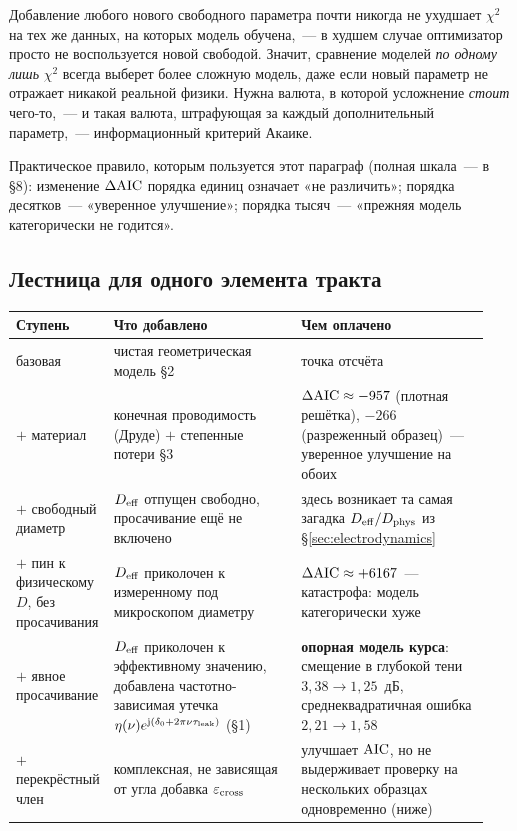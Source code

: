 \begin{intuition}
Добавление любого нового свободного параметра почти никогда не ухудшает $\chi^2$ на тех же
данных, на которых модель обучена,~--- в худшем случае оптимизатор просто не воспользуется новой
свободой. Значит, сравнение моделей \emph{по одному лишь} $\chi^2$ всегда выберет более сложную
модель, даже если новый параметр не отражает никакой реальной физики. Нужна валюта, в которой
усложнение \emph{стоит} чего-то,~--- и такая валюта, штрафующая за каждый дополнительный
параметр,~--- информационный критерий Акаике.
\end{intuition}

\noindent
Практическое правило, которым пользуется этот параграф (полная шкала~--- в §8): изменение
$\Delta\mathrm{AIC}$ порядка единиц означает «не различить»; порядка десятков~--- «уверенное улучшение»;
порядка тысяч~--- «прежняя модель категорически не годится».

\subsection{Лестница для одного элемента тракта}
\label{subsec:ladder-single}

\begin{center}
\footnotesize
\setlength{\tabcolsep}{6pt}
\begin{tabular}{@{}p{0.14\linewidth}p{0.40\linewidth}p{0.40\linewidth}@{}}
\toprule
\textbf{Ступень} & \textbf{Что добавлено} & \textbf{Чем оплачено} \\
\midrule
базовая & чистая геометрическая модель §2 & точка отсчёта \\
$+$ материал & конечная проводимость (Друде) $+$ степенные потери §3 &
$\Delta\mathrm{AIC}\approx-957$ (плотная решётка), $-266$ (разреженный образец)~--- уверенное улучшение на
обоих \\
$+$ свободный диаметр & $D_{\mathrm{eff}}$ отпущен свободно, просачивание ещё не включено & здесь
возникает та самая загадка $D_{\mathrm{eff}}/D_{\mathrm{phys}}$ из §\ref{sec:electrodynamics} \\
$+$ пин к физическому $D$, без просачивания & $D_{\mathrm{eff}}$ приколочен к измеренному под микроскопом
диаметру & $\Delta\mathrm{AIC}\approx+6167$~--- катастрофа: модель категорически хуже \\
$+$ явное просачивание & $D_{\mathrm{eff}}$ приколочен к эффективному значению, добавлена
частотно-зависимая утечка $\eta(\nu)e^{\mathrm{j}(\delta_0+2\pi\nu\tau_{\mathrm{leak}})}$ (§1) & \textbf{опорная
модель курса}: смещение в глубокой тени $3{,}38\to1{,}25$~дБ, среднеквадратичная ошибка
$2{,}21\to1{,}58$ \\
$+$ перекрёстный член & комплексная, не зависящая от угла добавка $\varepsilon_{\rm cross}$ &
улучшает $\operatorname{AIC}$, но не выдерживает проверку на нескольких образцах одновременно (ниже) \\
\bottomrule
\end{tabular}
\end{center}

